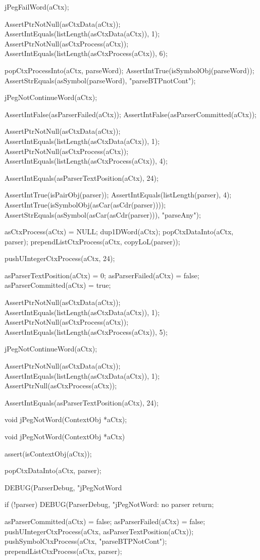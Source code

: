   jPegFailWord(aCtx);

  AssertPtrNotNull(asCtxData(aCtx));
  AssertIntEquals(listLength(asCtxData(aCtx)), 1);
  AssertPtrNotNull(asCtxProcess(aCtx));
  AssertIntEquals(listLength(asCtxProcess(aCtx)), 6);
  
  popCtxProcessInto(aCtx, parseWord);
  AssertIntTrue(isSymbolObj(parseWord));
  AssertStrEquals(asSymbol(parseWord), "parseBTPnotCont");
  
  jPegNotContinueWord(aCtx);
  
  AssertIntFalse(asParserFailed(aCtx));
  AssertIntFalse(asParserCommitted(aCtx));
  
  AssertPtrNotNull(asCtxData(aCtx));
  AssertIntEquals(listLength(asCtxData(aCtx)), 1);
  AssertPtrNotNull(asCtxProcess(aCtx));
  AssertIntEquals(listLength(asCtxProcess(aCtx)), 4);
    
  AssertIntEquals(asParserTextPosition(aCtx), 24);
  
  AssertIntTrue(isPairObj(parser));
  AssertIntEquals(listLength(parser), 4);
  AssertIntTrue(isSymbolObj(asCar(asCdr(parser))));
  AssertStrEquals(asSymbol(asCar(asCdr(parser))), "parseAny");
\stopCTest
\stopTestCase

\startCTest
  asCtxProcess(aCtx) = NULL;
  dup1DWord(aCtx);
  popCtxDataInto(aCtx, parser);
  prependListCtxProcess(aCtx, copyLoL(parser));
  
  pushUIntegerCtxProcess(aCtx, 24);

  asParserTextPosition(aCtx) = 0;
  asParserFailed(aCtx)       = false;
  asParserCommitted(aCtx)    = true;
  
  AssertPtrNotNull(asCtxData(aCtx));
  AssertIntEquals(listLength(asCtxData(aCtx)), 1);
  AssertPtrNotNull(asCtxProcess(aCtx));
  AssertIntEquals(listLength(asCtxProcess(aCtx)), 5);
    
  jPegNotContinueWord(aCtx);
  
  AssertPtrNotNull(asCtxData(aCtx));
  AssertIntEquals(listLength(asCtxData(aCtx)), 1);
  AssertPtrNull(asCtxProcess(aCtx));
  
  AssertIntEquals(asParserTextPosition(aCtx), 24);
\stopCTest
\stopTestCase
\stopTestSuite

\startTestSuite[jPegNotWord]

\startCHeader
void jPegNotWord(ContextObj *aCtx);
\stopCHeader

\startCCode
void jPegNotWord(ContextObj *aCtx) {
  assert(isContextObj(aCtx));
  
  popCtxDataInto(aCtx, parser);
  
  DEBUG(ParserDebug, "jPegNotWord%
  
  if (!parser) {
    DEBUG(ParserDebug, "jPegNotWord: no parser%
    return;
  }

  asParserCommitted(aCtx) = false;
  asParserFailed(aCtx)    = false;
  pushUIntegerCtxProcess(aCtx, asParserTextPosition(aCtx));
  pushSymbolCtxProcess(aCtx, "parseBTPNotCont");
  prependListCtxProcess(aCtx, parser);
}
\stopCCode

